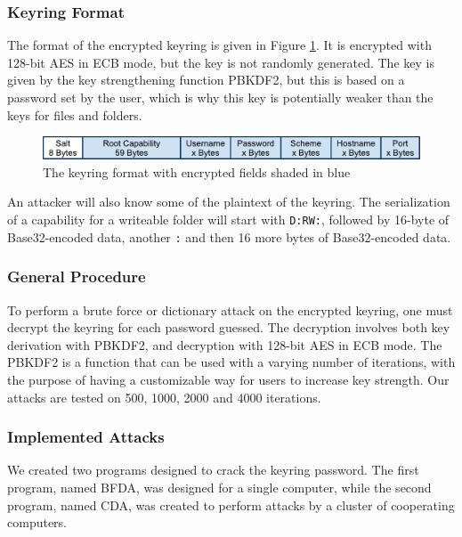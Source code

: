 \documentclass[pdftex,english,10pt,b5paper,twoside]{book}
\begin{document}
\subsubsection{Keyring Format}

The format of the encrypted keyring is given in Figure \ref{fig:KeyringFormat}.
It is encrypted with 128-bit \ac{AES} in \ac{ECB} mode, but the key is not
randomly generated. The key is given by the key strengthening function
\ac{PBKDF2}, but this is based on a password set by the user, which is why this
key is potentially weaker than the keys for files and folders.

\begin{figure}[h!]
    \centering
    \includegraphics[scale=0.6]{KeyringFormat.pdf}
    \caption{The keyring format with encrypted fields shaded in blue}
    \label{fig:KeyringFormat}
\end{figure}

An attacker will also know some of the plaintext of the keyring. The
serialization of a capability for a writeable folder will
start with \texttt{D:RW:}, followed by 16-byte of Base32-encoded data, another
\texttt{:} and then 16 more bytes of Base32-encoded data.

\subsubsection{General Procedure}

To perform a brute force or dictionary attack on the encrypted keyring, one
must decrypt the keyring for each password guessed. The decryption involves
both key derivation with \ac{PBKDF2}, and decryption with 128-bit \ac{AES} in
\ac{ECB} mode. The \ac{PBKDF2} is a function that can be used with a
varying number of iterations, with the purpose of having a customizable way for
users to increase key strength. Our attacks are tested on 500, 1000, 2000 and
4000 iterations.


\subsubsection{Implemented Attacks}

We created two programs designed to crack the keyring password. The first
program, named \acf{BFDA}, was designed for a single computer, while the second
program, named \acf{CDA}, was created to perform attacks by a cluster of
cooperating computers.
\end{document}
